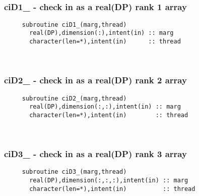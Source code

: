  
\mbox{}\hrulefill\ 
 
  \subsubsection{ciD1\_ - check in as a real(DP) rank 1 array}

\begin{verbatim} 
     subroutine ciD1_(marg,thread)
       real(DP),dimension(:),intent(in) :: marg
       character(len=*),intent(in)      :: thread
 \end{verbatim}%
 
 
\mbox{}\hrulefill\ 

  \subsubsection{ciD2\_ - check in as a real(DP) rank 2 array}

\begin{verbatim} 
     subroutine ciD2_(marg,thread)
       real(DP),dimension(:,:),intent(in) :: marg
       character(len=*),intent(in)        :: thread
 \end{verbatim}%
 
 
\mbox{}\hrulefill\ 
 
  \subsubsection{ciD3\_ - check in as a real(DP) rank 3 array}

\begin{verbatim} 
     subroutine ciD3_(marg,thread)
       real(DP),dimension(:,:,:),intent(in) :: marg
       character(len=*),intent(in)          :: thread
 \end{verbatim}%
 

